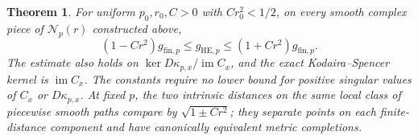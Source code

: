 \documentclass[11pt]{amsart}
\newtheorem{theorem}{Theorem}[section]
\theoremstyle{definition}
\theoremstyle{remark}
\newcommand{\cN}{\mathcal N}
\newcommand{\im}{\operatorname{im}}
\begin{document}
\begin{theorem}\label{thm:quotient-metric}
For uniform $p_0,r_0,C>0$ with $Cr_0^2<1/2$, on every smooth
complex piece of $\cN_p(r)$ constructed above,
\begin{equation}\label{eq:quotient-relative}
 (1-Cr^2)g_{\mathrm{fin},p}\le g_{\mathrm{HE},p}
                         \le(1+Cr^2)g_{\mathrm{fin},p}.
\end{equation}
The estimate also holds on $\ker D\kappa_{p,x}/\im C_x$, and the
exact Kodaira--Spencer kernel is $\im C_x$. The constants require no
lower bound for positive singular values of $C_x$ or $D\kappa_{p,x}$.
At fixed $p$, the two intrinsic distances on the same local class of
piecewise smooth paths compare by $\sqrt{1\pm Cr^2}$; they separate
points on each finite-distance component and have canonically equivalent
metric completions.
\end{theorem}
\end{document}
